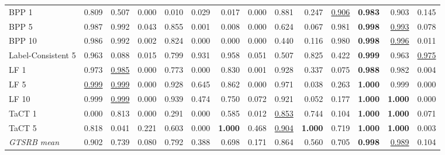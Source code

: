 \begin{table}[htbp]
\begin{adjustbox}{max width=\linewidth}
\begin{tabular}{lrrrrrrrrrrrrr}
BPP 1 & 0.809 & 0.507 & \textcolor{black!45}{0.000} & \textcolor{black!45}{0.010} & \textcolor{black!45}{0.029} & \textcolor{black!45}{0.017} & \textcolor{black!45}{0.000} & 0.881 & \textcolor{black!45}{0.247} & \underline{0.906} & \textbf{0.983} & 0.903 & \textcolor{black!45}{0.145} \\
BPP 5 & 0.987 & 0.992 & \textcolor{black!45}{0.043} & 0.855 & \textcolor{black!45}{0.001} & \textcolor{black!45}{0.008} & \textcolor{black!45}{0.000} & 0.624 & \textcolor{black!45}{0.067} & 0.981 & \textbf{0.998} & \underline{0.993} & \textcolor{black!45}{0.078} \\
BPP 10 & 0.986 & 0.992 & \textcolor{black!45}{0.002} & 0.824 & \textcolor{black!45}{0.000} & \textcolor{black!45}{0.000} & \textcolor{black!45}{0.000} & \textcolor{black!45}{0.440} & \textcolor{black!45}{0.116} & 0.980 & \textbf{0.998} & \underline{0.996} & \textcolor{black!45}{0.011} \\
Label-Consistent 5 & 0.963 & \textcolor{black!45}{0.088} & \textcolor{black!45}{0.015} & 0.799 & 0.931 & 0.958 & \textcolor{black!45}{0.051} & 0.507 & 0.825 & \textcolor{black!45}{0.422} & \textbf{0.999} & 0.963 & \underline{0.975} \\
LF 1 & 0.973 & \underline{0.985} & \textcolor{black!45}{0.000} & 0.773 & \textcolor{black!45}{0.000} & 0.830 & \textcolor{black!45}{0.001} & 0.928 & \textcolor{black!45}{0.337} & \textcolor{black!45}{0.075} & \textbf{0.988} & 0.982 & \textcolor{black!45}{0.004} \\
LF 5 & \underline{0.999} & \underline{0.999} & \textcolor{black!45}{0.000} & 0.928 & 0.645 & 0.862 & \textcolor{black!45}{0.000} & 0.971 & \textcolor{black!45}{0.038} & \textcolor{black!45}{0.263} & \textbf{1.000} & 0.999 & \textcolor{black!45}{0.000} \\
LF 10 & 0.999 & \underline{0.999} & \textcolor{black!45}{0.000} & 0.939 & \textcolor{black!45}{0.474} & 0.750 & \textcolor{black!45}{0.072} & 0.921 & \textcolor{black!45}{0.052} & \textcolor{black!45}{0.177} & \textbf{1.000} & \textbf{1.000} & \textcolor{black!45}{0.000} \\
TaCT 1 & \textcolor{black!45}{0.000} & 0.813 & \textcolor{black!45}{0.000} & \textcolor{black!45}{0.291} & \textcolor{black!45}{0.000} & 0.585 & \textcolor{black!45}{0.012} & \underline{0.853} & 0.744 & \textcolor{black!45}{0.104} & \textbf{1.000} & \textbf{1.000} & \textcolor{black!45}{0.071} \\
TaCT 5 & 0.818 & \textcolor{black!45}{0.041} & \textcolor{black!45}{0.221} & 0.603 & \textcolor{black!45}{0.000} & \textbf{1.000} & \textcolor{black!45}{0.468} & \underline{0.904} & \textbf{1.000} & 0.719 & \textbf{1.000} & \textbf{1.000} & \textcolor{black!45}{0.003} \\
\rowcolor{black!8}\emph{GTSRB mean} & 0.902 & 0.739 & \textcolor{black!45}{0.080} & 0.792 & \textcolor{black!45}{0.388} & 0.698 & \textcolor{black!45}{0.171} & 0.864 & 0.560 & 0.705 & \textbf{0.998} & \underline{0.989} & \textcolor{black!45}{0.104} \\
\bottomrule
\end{tabular}
\end{adjustbox}
\end{table}
